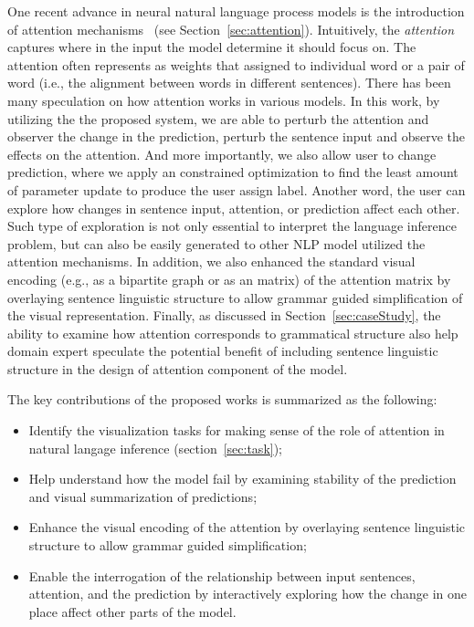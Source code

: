 One recent advance in neural natural language process models is the introduction of attention mechanisms~\cite{VaswaniShazeerParmar2017} (see Section~\ref{sec:attention}). Intuitively, the \emph{attention} captures where in the input the model determine it should focus on. The attention often represents as weights that assigned to individual word or a pair of word (i.e., the alignment between words in different sentences).
%
There has been many speculation on how attention works in various models. In this work, by utilizing the the proposed system, we are able to perturb the attention and observer the change in the prediction, perturb the sentence input and observe the effects on the attention. And more importantly, we also allow user to change prediction, where we apply an constrained optimization to find the least amount of parameter update to produce the user assign label. Another word, the user can explore how changes in sentence input, attention, or prediction affect each other. Such type of exploration is not only essential to interpret the language inference problem, but can also be easily generated to other NLP model utilized the attention mechanisms.
%
In addition, we also enhanced the standard visual encoding (e.g., as a bipartite graph or as an matrix) of the attention matrix by overlaying sentence linguistic structure to allow grammar guided simplification of the visual representation.
%
Finally, as discussed in Section~\ref{sec:caseStudy}, the ability to examine how attention corresponds to grammatical structure also help domain expert speculate the potential benefit of including sentence linguistic structure in the design of attention component of the model.

The key contributions of the proposed works is summarized as the following:
\begin{itemize}
    \item Identify the visualization tasks for making sense of the role of attention in natural langage inference (section~\ref{sec:task});

    \item Help understand how the model fail by examining stability of the prediction and visual summarization of predictions;

    \item Enhance the visual encoding of the attention by overlaying sentence linguistic structure to allow grammar guided simplification;

    \item Enable the interrogation of the relationship between input sentences, attention, and the prediction by interactively exploring how the change in one place affect other parts of the model.
\end{itemize}
%

